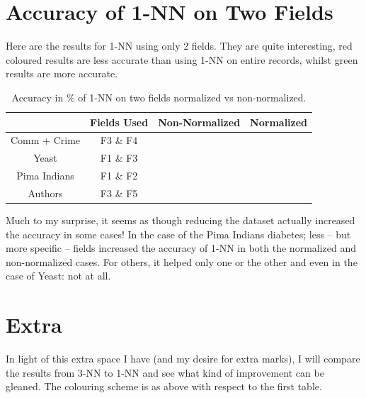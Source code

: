 \documentclass[a4paper,10pt]{article}
\begin{document}
  \section{Accuracy of 1-NN on Two Fields}
    Here are the results for 1-NN using only 2 fields. They are quite interesting, red coloured results
    are less accurate than using 1-NN on entire records, whilst green results are more accurate.
    \begin{table}[hc]
      \centering
      \caption{Accuracy in \% of 1-NN on two fields normalized vs non-normalized.} \indent
      \begin{tabular}{|c|c|c|c|}
        \hline
                      &  \textbf{Fields Used}  & \textbf{Non-Normalized} & \textbf{Normalized} \\ \hline
        Comm + Crime  &   F3 \& F4       &   \textcolor{red}{}        &  \textcolor{green}{}    \\
        Yeast         &   F1 \& F3       &   \textcolor{red}{}        &  \textcolor{red}{}    \\
        Pima Indians  &   F1 \& F2       &   \textcolor{green}{}       &  \textcolor{green}{}    \\
        Authors       &   F3 \& F5       &   \textcolor{green}{}      &   \textcolor{red}{}    \\
        \hline
      \end{tabular}
    \end{table}
 
    Much to my surprise, it seems as though reducing the dataset actually increased the accuracy in some cases!
    In the case of the Pima Indians diabetes; less -- but more specific -- fields increased the accuracy of 1-NN
    in both the normalized and non-normalized cases. For others, it helped only one or the other and even in the
    case of Yeast: not at all.

  \section{Extra}
    In light of this extra space I have (and my desire for extra marks), I will compare the results from 3-NN to 1-NN and see what kind of
    improvement can be gleaned. The colouring scheme is as above with respect to the first table.
  
\end{document}
